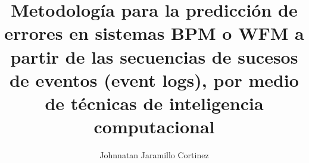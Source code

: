 
\title{Metodología para la predicción de errores en sistemas BPM o WFM a partir de las secuencias de sucesos de eventos (event logs), por medio de técnicas de inteligencia computacional}


\author{Johnnatan Jaramillo Cortinez}












\renewcommand{\submissiontext}{Esta disertación es presentada para el grado de}




\subject{LaTeX} 
